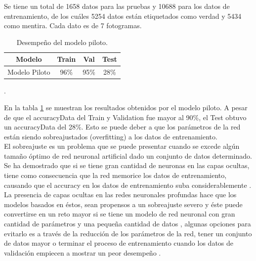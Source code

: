 \begin{onehalfspacing}

Se tiene un total de 1658 datos para las pruebas y 10688 para los datos de entrenamiento, de los cuáles 5254 datos están etiquetados como verdad y 5434 como mentira. Cada dato es de 7 fotogramas.\\

\begin{table}[h!]
\centering
    \begin{tabular}{c c c c}
         \hline
         \textbf{Modelo} & \textbf{Train} & \textbf{Val} & \textbf{Test}\\
         \hline
         Modelo Piloto & 96\% & 95\% & 28\%\\
         \hline
    \end{tabular}
    \caption{\footnotesize  Desempeño del modelo piloto.}.
    \label{tab:TModeloPiloto}
\end{table}

En la tabla \ref{tab:TModeloPiloto} se muestran los resultados obtenidos por el modelo piloto. A pesar de que el accuracyData del Train y Validation fue mayor al 90\%, el Test obtuvo un accuracyData del 28\%. Esto se puede deber a que los parámetros de la red están siendo sobreajustados (overfitting) a los datos de entrenamiento.\\

El sobreajuste es un problema que se puede presentar cuando se excede algún tamaño óptimo de red neuronal artificial dado un conjunto de datos determinado. Se ha demostrado que si se tiene gran cantidad de neuronas en las capas ocultas, tiene como consecuencia que la red memorice los datos de entrenamiento, causando que el accuracy en los datos de entrenamiento suba considerablemente \cite{Tetko1995Neural1.}.\\

La presencia de capas ocultas en las redes neuronales profundas hace que los modelos basados en éstos, sean propensos a un sobreajuste severo y éste puede convertirse en un reto mayor si se tiene un modelo de red neuronal con gran cantidad de parámetros y una pequeña cantidad de datos \cite{Tabares2013ImprovingDropout}, algunas opciones para evitarlo es a través de la reducción de los parámetros de la red, tener un conjunto de datos mayor o terminar el proceso de entrenamiento cuando los datos de validación empiecen a mostrar un peor desempeño \cite{Caruana2001OverfittingStopping}.\\


\end{onehalfspacing}

